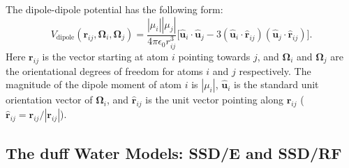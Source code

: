 \documentclass[]{book}
\begin{document}
The dipole-dipole potential has the following form:
\begin{equation}
V_{\text{dipole}}(\mathbf{r}_{ij},\boldsymbol{\Omega}_{i},
	\boldsymbol{\Omega}_{j}) = \frac{|\mu_i||\mu_j|}{4\pi\epsilon_{0}r_{ij}^{3}} \biggl[
	\boldsymbol{\hat{u}}_{i} \cdot \boldsymbol{\hat{u}}_{j}
	-
	3(\boldsymbol{\hat{u}}_i \cdot \hat{\mathbf{r}}_{ij}) %
		(\boldsymbol{\hat{u}}_j \cdot \hat{\mathbf{r}}_{ij}) \biggr].
\label{eq:dipolePot}
\end{equation}
Here $\mathbf{r}_{ij}$ is the vector starting at atom $i$ pointing
towards $j$, and $\boldsymbol{\Omega}_i$ and $\boldsymbol{\Omega}_j$
are the orientational degrees of freedom for atoms $i$ and $j$
respectively. The magnitude of the dipole moment of atom $i$ is
$|\mu_i|$, $\boldsymbol{\hat{u}}_i$ is the standard unit orientation
vector of $\boldsymbol{\Omega}_i$, and $\boldsymbol{\hat{r}}_{ij}$ is
the unit vector pointing along $\mathbf{r}_{ij}$
($\boldsymbol{\hat{r}}_{ij}=\mathbf{r}_{ij}/|\mathbf{r}_{ij}|$).

\subsection{\label{section:SSD}The {\sc duff} Water Models: SSD/E
and SSD/RF} 
\end{document}
